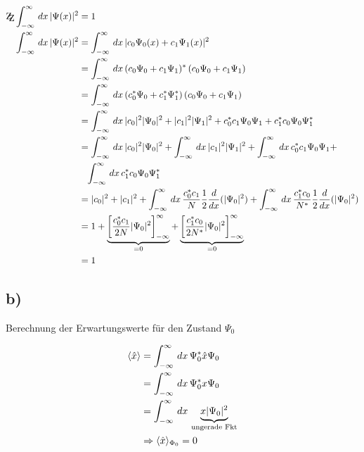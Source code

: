 \begin{align*}
    \mathrm{Z\kern-.3em\raise-0.5ex\hbox{Z}} \int_{-\infty}^{\infty} \, dx \, \abs{\Psi (x)}^2&=1\\
    \int_{-\infty}^{\infty} \, dx\, \abs{\Psi (x)}^2 &= \int_{-\infty}^{\infty}\, dx\, \abs{c_0 \Psi _0 (x) + c_1 \Psi _1(x)}^2\\
    &=\int_{-\infty}^{\infty} \, dx\, (c_0 \Psi _0  + c_1 \Psi _1)^* \,(c_0 \Psi _0  + c_1 \Psi _1)\\
    &=\int_{-\infty}^{\infty} \, dx\, (c_0^* \Psi _0  + c_1^* \Psi _1^*) \,(c_0 \Psi _0  + c_1 \Psi _1)\\
    &=\int_{-\infty}^{\infty} \, dx\, \abs{c_0}^2 \abs{\Psi _0}^2+\abs{c_1}^2 \abs{\Psi _1}^2 + c_0^* c_1 \Psi _0 \Psi _1+c_1^* c_0 \Psi _0 \Psi_1^*\\
    &=\int_{-\infty}^{\infty} \, dx\, \abs{c_0}^2 \abs{\Psi _0}^2 +\int_{-\infty}^{\infty} \, dx\,\abs{c_1}^2 \abs{\Psi _1}^2 +\int_{-\infty}^{\infty} \, dx\, c_0^* c_1 \Psi _0 \Psi _1+ \\
    &\phantom{=} \int_{-\infty}^{\infty} \, dx\, c_1^* c_0 \Psi _0 \Psi_1^*\\
    &= \abs{c_0}^2+\abs{c_1}^2+ \int_{-\infty}^ {\infty}\,dx\, \frac{c_0^*c_1}{N}\frac{1}{2} \frac{d}{d x}(\abs{\Psi _0}^2)+ \int_{-\infty}^{\infty} \,dx\, \frac{c_1^*c_0}{N^*}\frac{1}{2}\frac{d}{d x}(\abs{\Psi _0}^2) \\
    &= 1+ \underbrace{\left[\frac{c_0^*c_1}{2N}\abs{\Psi _0}^2\right]_{-\infty}^{\infty}}_{=0} + \underbrace{\left[\frac{c_1^*c_0}{2N^*}\abs{\Psi _0}^2 \right]_{-\infty}^{\infty}}_{=0} \\
    &=1
\end{align*}

\subsection{b)}

Berechnung der Erwartungswerte für den Zustand $\Psi _0$

\begin{align}
    \langle\hat x \rangle &= \int_{-\infty}^{\infty}\,dx\, \Psi _0^* \hat x \Psi _0\\
    &= \int_{-\infty}^{\infty} \,dx\, \Psi _0^* x \Psi _0\\
    &= \int_{-\infty}^{\infty} \,dx\, \underbrace{x \lvert\Psi _0\rvert^2}_{\text{ungerade Fkt}}\\
    &\Rightarrow \langle\hat x\rangle_{\Phi _0}=0
\end{align}


